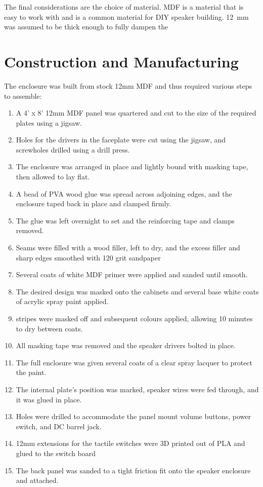 \documentclass[main.tex]{subfiles}
\begin{document}
The final considerations are the choice of material.
MDF is a material that is easy to work with and is a common material for DIY speaker building.
\SI{12}{\milli\metre} was assumed to be thick enough to fully dampen the 
\section{Construction and Manufacturing}

The enclosure was built from stock 12mm MDF and thus required various steps to assemble:

\begin{enumerate}
    \item A 4' x 8' 12mm MDF panel was quartered and cut to the size of the required plates using a jigsaw.
    \item Holes for the drivers in the faceplate were cut using the jigsaw, and screwholes drilled using a drill press.
    \item The enclosure was arranged in place and lightly bound with masking tape, then allowed to lay flat.
    \item A bead of PVA wood glue was spread across adjoining edges, and the enclosure taped back in place and clamped firmly.
    \item The glue was left overnight to set and the reinforcing tape and clamps removed.
    \item Seams were filled with a wood filler, left to dry, and the excess filler and sharp edges smoothed with 120 grit sandpaper
    \item Several coats of white MDF primer were applied and sanded until smooth.
    \item The desired design was masked onto the cabinets and several base white coats of acrylic spray paint applied.
    \item stripes were masked off and subsequent colours applied, allowing 10 minutes to dry between coats.
    \item All masking tape was removed and the speaker drivers bolted in place.
    \item The full enclosure was given several coats of a clear spray lacquer to protect the paint.
    \item The internal plate's position was marked, speaker wires were fed through, and it was glued in place.
    \item Holes were drilled to accommodate the panel mount volume buttons, power switch, and DC barrel jack.
    \item 12mm extensions for the tactile switches were 3D printed out of PLA and glued to the switch board
    \item The back panel was sanded to a tight friction fit onto the speaker enclosure and attached.
\end{enumerate}
\end{document}

